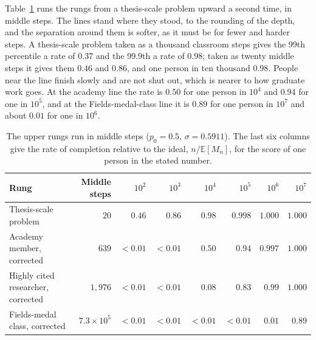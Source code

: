 \documentclass{article}
\begin{document}
Table~\ref{tab:middle} runs the rungs from a thesis-scale problem upward a second time, in middle steps. The lines stand where they stood, to the rounding of the depth, and the separation around them is softer, as it must be for fewer and harder steps. A thesis-scale problem taken as a thousand classroom steps gives the 99th percentile a rate of $0.37$ and the 99.9th a rate of $0.98$; taken as twenty middle steps it gives them $0.46$ and $0.86$, and one person in ten thousand $0.98$. People near the line finish slowly and are not shut out, which is nearer to how graduate work goes. At the academy line the rate is $0.50$ for one person in $10^{4}$ and $0.94$ for one in $10^{5}$, and at the Fields-medal-class line it is $0.89$ for one person in $10^{7}$ and about $0.01$ for one in $10^{6}$.

\begin{table}[ht]
  \centering
  \caption{The upper rungs run in middle steps ($p_0 = 0.5$, $\sigma = 0.5911$). The last six columns give the rate of completion relative to the ideal, $n/\mathbb{E}[M_n]$, for the score of one person in the stated number.}
  \label{tab:middle}
  \medskip\small\setlength{\tabcolsep}{4pt}
  \begin{tabular}{l r r r r r r r}
    \hline
    Rung & Middle steps & $10^{2}$ & $10^{3}$ & $10^{4}$ & $10^{5}$ & $10^{6}$ & $10^{7}$ \\
    \hline
    Thesis-scale problem & $20$ & $0.46$ & $0.86$ & $0.98$ & $0.998$ & $1.000$ & $1.000$ \\
    Academy member, corrected & $639$ & $<0.01$ & $<0.01$ & $0.50$ & $0.94$ & $0.997$ & $1.000$ \\
    Highly cited researcher, corrected & $1{,}976$ & $<0.01$ & $<0.01$ & $0.08$ & $0.83$ & $0.99$ & $1.000$ \\
    Fields-medal class, corrected & $7.3 \times 10^{5}$ & $<0.01$ & $<0.01$ & $<0.01$ & $<0.01$ & $0.01$ & $0.89$ \\
    \hline
  \end{tabular}
\end{table}
\end{document}
